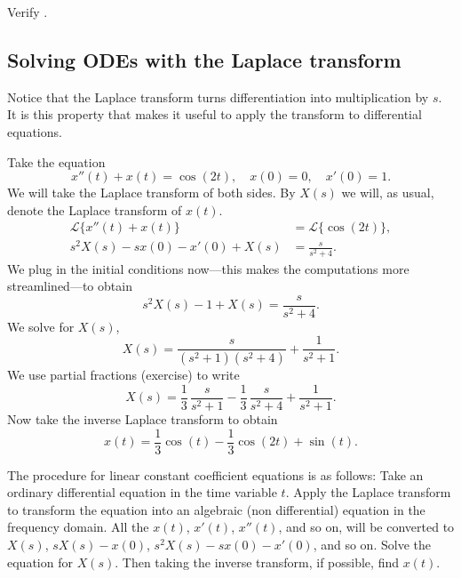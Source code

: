\begin{exercise}
Verify .
\end{exercise}

\subsection{Solving ODEs with the Laplace transform}

Notice that the Laplace transform turns differentiation into
multiplication by $s$.
It is this property that makes it useful to apply 
the transform to differential equations.

\begin{example}
Take the equation
\begin{equation*}
x''(t) + x(t) = \cos (2t), \quad x(0) = 0, \quad x'(0) = 1 .
\end{equation*}
We will take the Laplace transform of both sides.
By $X(s)$ we will, as usual, denote the Laplace transform of
$x(t)$.
\begin{align*}
\mathcal{L} \bigl\{ x''(t) + x(t) \bigr\} & = \mathcal{L} \bigl\{ \cos (2t) \bigr\} , \\
s^2 X(s) -sx(0)-x'(0) + X(s) & = \frac{s}{s^2 + 4} .
\end{align*}
We plug in the initial conditions now---this makes the computations more
streamlined---to obtain
\begin{equation*}
s^2 X(s) -1 + X(s) = \frac{s}{s^2 + 4} .
\end{equation*}
We solve for $X(s)$,
\begin{equation*}
X(s) = \frac{s}{(s^2+1)(s^2 + 4)} + \frac{1}{s^2+1} .
\end{equation*}
We use partial fractions (exercise) to write
\begin{equation*}
X(s) =\frac{1}{3} \, \frac{s}{s^2+1} - 
\frac{1}{3}\, \frac{s}{s^2+4} + \frac{1}{s^2+1} .
\end{equation*}
Now take the inverse Laplace transform to obtain
\begin{equation*}
x(t) =\frac{1}{3}  \cos (t) -
\frac{1}{3} \cos (2t) + \sin (t) .
\end{equation*}
\end{example}

The procedure for linear constant coefficient equations is as follows:
Take an ordinary differential
equation in the time variable $t$.  Apply the Laplace transform
to transform the equation into an algebraic (non differential) equation in
the frequency domain.  All the $x(t)$, $x'(t)$, $x''(t)$, and so on, will
be converted to $X(s)$, $sX(s) - x(0)$, $s^2X(s) - sx(0) - x'(0)$,
and so on.
Solve the equation for $X(s)$.
Then taking the inverse transform, if possible, find $x(t)$.

